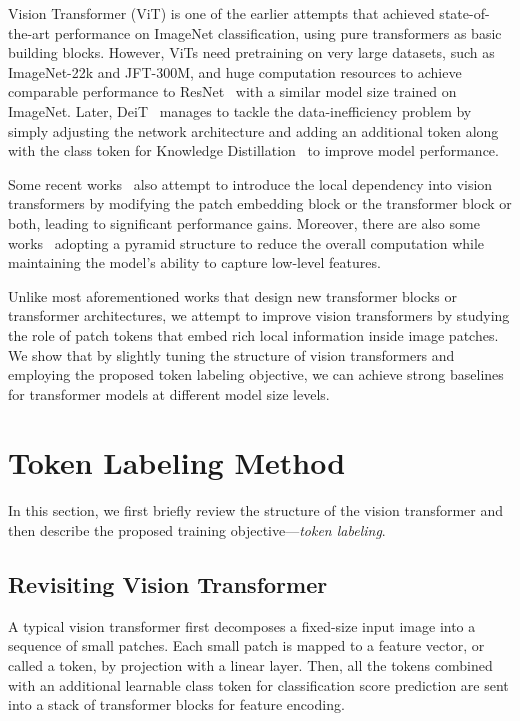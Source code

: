 \documentclass{article}
\begin{document}
Vision Transformer (ViT) is one of the earlier attempts that achieved state-of-the-art performance on ImageNet classification, using pure transformers as basic building blocks.
However, ViTs need pretraining on very large datasets, such as ImageNet-22k and JFT-300M,
and huge computation resources to achieve comparable performance to ResNet~\cite{he2016deep} with a similar model size trained on ImageNet.
Later, DeiT~\cite{touvron2020training} manages to tackle the data-inefficiency problem by simply adjusting the network architecture and adding an additional token along with the class token for Knowledge Distillation~\cite{hinton2015distilling, yuan2020revisiting} to improve model performance.

Some recent works~\cite{chen2021crossvit,han2021transformer,wu2021cvt,yuan2021tokens} also attempt to introduce the local dependency into vision transformers by modifying the patch embedding block or the transformer block or both, leading to significant performance gains.
Moreover, there are also some works~\cite{heo2021rethinking,liu2021swin,wang2021pyramid} adopting a pyramid structure to reduce the overall computation while maintaining the model's ability to capture low-level features.


Unlike most aforementioned works that design new transformer blocks or transformer architectures, we attempt to improve vision transformers by studying the role of patch tokens that embed rich local information inside image patches.
We show that by slightly tuning the structure of vision transformers and employing the proposed token labeling objective,
we can achieve strong baselines for transformer models at different model size levels.





\section{Token Labeling Method}

In this section, we first briefly review the structure of the vision transformer \cite{dosovitskiy2020image}
and then describe the proposed training objective---\emph{token labeling}.


\subsection{Revisiting Vision Transformer}

A typical vision transformer \cite{dosovitskiy2020image} first decomposes a fixed-size input image into a sequence of small patches.
Each small patch is mapped to a feature vector, or called a token, by projection with a linear layer.
Then, all the tokens combined with an additional learnable class token for classification score prediction are sent into a stack of transformer blocks for feature encoding.
\end{document}
